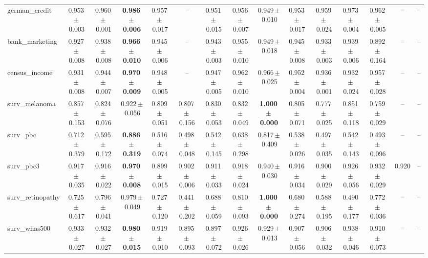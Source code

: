 \documentclass[8pt]{extarticle}
\begin{document}
\begin{longtable}{l*{14}{c}}
german\_credit & 0.953\,$\pm$\,0.003 & 0.960\,$\pm$\,0.001 & \textbf{0.986\,$\pm$\,0.006} & 0.957\,$\pm$\,0.017 & -- & 0.951\,$\pm$\,0.015 & 0.956\,$\pm$\,0.007 & 0.949\,$\pm$\,0.010 & 0.953\,$\pm$\,0.017 & 0.959\,$\pm$\,0.024 & 0.973\,$\pm$\,0.004 & 0.962\,$\pm$\,0.005 & -- & -- \\
bank\_marketing & 0.927\,$\pm$\,0.008 & 0.938\,$\pm$\,0.008 & \textbf{0.966\,$\pm$\,0.010} & 0.945\,$\pm$\,0.006 & -- & 0.943\,$\pm$\,0.003 & 0.955\,$\pm$\,0.010 & 0.949\,$\pm$\,0.018 & 0.945\,$\pm$\,0.008 & 0.933\,$\pm$\,0.003 & 0.939\,$\pm$\,0.006 & 0.892\,$\pm$\,0.164 & -- & -- \\
census\_income & 0.931\,$\pm$\,0.008 & 0.944\,$\pm$\,0.007 & \textbf{0.970\,$\pm$\,0.009} & 0.948\,$\pm$\,0.005 & -- & 0.947\,$\pm$\,0.005 & 0.962\,$\pm$\,0.010 & 0.966\,$\pm$\,0.025 & 0.952\,$\pm$\,0.004 & 0.936\,$\pm$\,0.001 & 0.932\,$\pm$\,0.024 & 0.957\,$\pm$\,0.028 & -- & -- \\
surv\_melanoma & 0.857\,$\pm$\,0.153 & 0.824\,$\pm$\,0.076 & 0.922\,$\pm$\,0.056 & 0.809\,$\pm$\,0.051 & 0.807\,$\pm$\,0.156 & 0.830\,$\pm$\,0.053 & 0.832\,$\pm$\,0.049 & \textbf{1.000\,$\pm$\,0.000} & 0.805\,$\pm$\,0.071 & 0.777\,$\pm$\,0.025 & 0.851\,$\pm$\,0.118 & 0.759\,$\pm$\,0.029 & -- & -- \\
surv\_pbc & 0.712\,$\pm$\,0.379 & 0.595\,$\pm$\,0.172 & \textbf{0.886\,$\pm$\,0.319} & 0.516\,$\pm$\,0.074 & 0.498\,$\pm$\,0.048 & 0.542\,$\pm$\,0.145 & 0.638\,$\pm$\,0.298 & 0.817\,$\pm$\,0.409 & 0.538\,$\pm$\,0.026 & 0.497\,$\pm$\,0.035 & 0.542\,$\pm$\,0.143 & 0.493\,$\pm$\,0.096 & -- & -- \\
surv\_pbc3 & 0.917\,$\pm$\,0.035 & 0.916\,$\pm$\,0.022 & \textbf{0.970\,$\pm$\,0.008} & 0.899\,$\pm$\,0.015 & 0.902\,$\pm$\,0.006 & 0.911\,$\pm$\,0.033 & 0.918\,$\pm$\,0.024 & 0.940\,$\pm$\,0.030 & 0.916\,$\pm$\,0.034 & 0.900\,$\pm$\,0.029 & 0.926\,$\pm$\,0.056 & 0.932\,$\pm$\,0.029 & 0.920 & -- \\
surv\_retinopathy & 0.725\,$\pm$\,0.617 & 0.796\,$\pm$\,0.041 & 0.979\,$\pm$\,0.049 & 0.727\,$\pm$\,0.120 & 0.441\,$\pm$\,0.202 & 0.688\,$\pm$\,0.059 & 0.810\,$\pm$\,0.093 & \textbf{1.000\,$\pm$\,0.000} & 0.680\,$\pm$\,0.274 & 0.588\,$\pm$\,0.195 & 0.490\,$\pm$\,0.177 & 0.772\,$\pm$\,0.036 & -- & -- \\
surv\_whas500 & 0.933\,$\pm$\,0.027 & 0.932\,$\pm$\,0.027 & \textbf{0.980\,$\pm$\,0.015} & 0.919\,$\pm$\,0.010 & 0.895\,$\pm$\,0.093 & 0.897\,$\pm$\,0.072 & 0.926\,$\pm$\,0.026 & 0.929\,$\pm$\,0.013 & 0.907\,$\pm$\,0.056 & 0.906\,$\pm$\,0.032 & 0.938\,$\pm$\,0.046 & 0.910\,$\pm$\,0.073 & -- & -- \\

\end{longtable}
\end{document}
